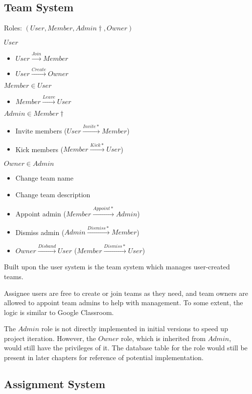 \subsection{Team System}
\label{overview.capab.team}

Roles: $(User, Member, Admin\dagger{}, Owner)$

$User$
\begin{itemize}
	\item $User\xrightarrow{Join}Member$

	\item $User\xrightarrow{Create}Owner$
\end{itemize}

$Member\in{}User$
\begin{itemize}
	\item $Member\xrightarrow{Leave}User$
\end{itemize}

$Admin\in{}Member\dagger{}$
\begin{itemize}
	\item Invite members ($User\xrightarrow{Invite*}Member$)

	\item Kick members ($Member\xrightarrow{Kick*}User$)
\end{itemize}

$Owner\in{}Admin$
\begin{itemize}
	\item Change team name

	\item Change team description

	\item Appoint admin ($Member\xrightarrow{Appoint*}Admin$) \textdagger{}

	\item Dismiss admin ($Admin\xrightarrow{Dismiss*}Member$) \textdagger{}

	\item $Owner\xrightarrow{Disband}User$ ($Member\xrightarrow{Dismiss*}User$)
\end{itemize}

Built upon the user system is the team system which manages user-created teams.

Assignee users are free to create or join teams as they need, and team owners
are allowed to appoint team admins to help with management. To some extent, the
logic is similar to Google Classroom.

\textdagger{} The $Admin$ role is not directly implemented in initial versions to
speed up project iteration. However, the $Owner$ role, which is inherited from
$Admin$, would still have the privileges of it. The database table for the role
would still be present in later chapters for reference of potential
implementation.

\subsection{Assignment System}
\label{overview.capab.assign}